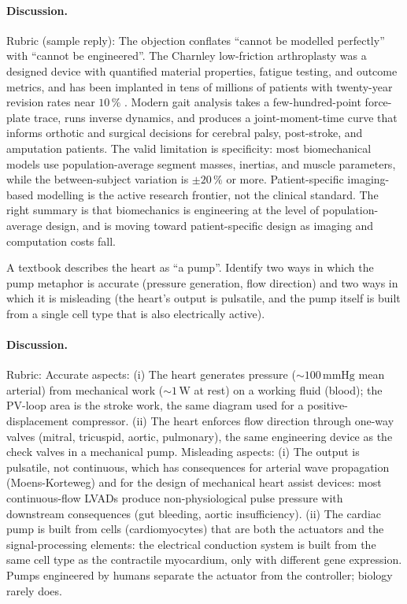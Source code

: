 \paragraph{Discussion.}
Rubric (sample reply): The objection conflates ``cannot be modelled
perfectly'' with ``cannot be engineered''. The Charnley low-friction
arthroplasty was a designed device with quantified material
properties, fatigue testing, and outcome metrics, and has been
implanted in tens of millions of patients with twenty-year revision
rates near $10\,\%$ \cite[ch.~14]{text:mow-huiskes-orthopaedic}.
Modern gait analysis takes a few-hundred-point force-plate trace,
runs inverse dynamics, and produces a joint-moment-time curve that
informs orthotic and surgical decisions for cerebral palsy,
post-stroke, and amputation patients. The valid limitation is
specificity: most biomechanical models use population-average
segment masses, inertias, and muscle parameters, while the
between-subject variation is $\pm 20\,\%$ or more. Patient-specific
imaging-based modelling is the active research frontier, not the
clinical standard. The right summary is that biomechanics is
engineering at the level of population-average design, and is
moving toward patient-specific design as imaging and computation
costs fall.

\begin{exercise}
A textbook describes the heart as ``a pump''. Identify two ways in
which the pump metaphor is accurate (pressure generation, flow
direction) and two ways in which it is misleading (the heart's
output is pulsatile, and the pump itself is built from a single cell
type that is also electrically active).
\end{exercise}

\paragraph{Discussion.}
Rubric: Accurate aspects: (i) The heart generates pressure
($\sim 100\,\text{mmHg}$ mean arterial) from mechanical work
($\sim 1\,\text{W}$ at rest) on a working fluid (blood); the
PV-loop area is the stroke work, the same diagram used for a
positive-displacement compressor. (ii) The heart enforces flow
direction through one-way valves (mitral, tricuspid, aortic,
pulmonary), the same engineering device as the check valves in a
mechanical pump.
Misleading aspects: (i) The output is pulsatile, not continuous,
which has consequences for arterial wave propagation (Moens-Korteweg)
and for the design of mechanical heart assist devices: most
continuous-flow LVADs produce non-physiological pulse pressure with
downstream consequences (gut bleeding, aortic insufficiency).
(ii) The cardiac pump is built from cells (cardiomyocytes) that are
both the actuators and the signal-processing elements: the
electrical conduction system is built from the same cell type as
the contractile myocardium, only with different gene expression.
Pumps engineered by humans separate the actuator from the
controller; biology rarely does.


